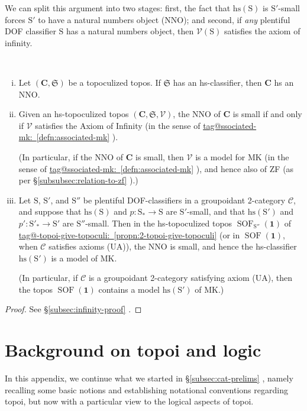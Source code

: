\documentclass{amsart}
\makeatletter
\newcommand\bC{\mathbf{C}}
\newcommand\cC{\mathcal{C}}
\newcommand\cV{\mathcal{V}}
\newcommand\enumbelow{\ }
\newcommand\fS{\mathfrak{S}}
\newcommand\hs{\mathrm{hs}}
\newcommand\rS{\mathrm{S}}
\newcommand\SOF{\operatorname{SOF}}
\newcommand\tm{\mathbf{1}}
\newcommand\tagword[1]{\csname tag@#1\endcsname}
\def\label@tag#1:#2\@nil{#1}
\newcommand\labeltag[1]{\label@tag#1:\@nil}
\newcommand\jref[1]{%
  \texorpdfstring%
    {\hyperref[#1]{\tagword{\labeltag{#1}}~\ref*{#1}}}%
    {\tagword{\labeltag{#1}}~\ref*{#1}}%
}
\newcommand\prerefpost[3]{%
  \texorpdfstring%
    {\hyperref[#2]{#1\ref*{#2}#3}}%
    {#1\ref*{#2}#3}%
}
\newcommand\sref[1]{\prerefpost{\S}{#1}{}}
\theoremstyle{definition}
\theoremstyle{remark}
\theoremstyle{plainwithref}
\makeatother
\begin{document}
We can split this argument into two stages: first, the fact that \( \hs(\rS) \) is \( \rS' \)-small forces \( \rS' \) to have a natural numbers object (NNO); and second, if \emph{any} plentiful DOF classifier \( \rS \) has a natural numbers object, then \( \cV(\rS) \) satisfies the axiom of infinity.
\begin{thm} \label{thm:infinity}\enumbelow
  \begin{enumerate}[(i)]
  \item\label{item:infinity-nno-exists} Let \( (\bC, \fS) \) be a topoculized topos.
    If \( \fS \) has an hs-classifier, then \( \bC \) hs an NNO.
  \item\label{item:infinity-small-nno} Given an hs-topoculized topos \( (\bC, \fS, \cV) \), the NNO of \( \bC \) is small if and only if \( \cV \) satisfies the Axiom of Infinity (in the sense of \jref{defn:associated-mk}).

    \noindent
    (In particular, if the NNO of \( \bC \) is small, then \( \cV \) is a model for MK (in the sense of \jref{defn:associated-mk}), and hence also of ZF (as per \sref{subsubsec:relation-to-zf}).)
  \item\label{item:infinity-2cat-has-nno}
    Let \( \rS \), \( \rS' \), and \( \rS'' \) be plentiful DOF-classifiers in a groupoidant 2-category \( \cC \), and suppose that \( \hs(\rS) \) and \( p \colon \rS_* \to \rS \) are \( \rS' \)-small, and that \( \hs(\rS') \) and \( p' \colon \rS'_* \to \rS' \) are \( \rS'' \)-small.
    Then in the hs-topoculized topos \( \SOF_{\rS''}(\tm) \) of \jref{propn:2-topoi-give-topoculi} (or in \( \SOF(\tm) \), when \( \cC \) satisfies axioms (UA)), the NNO is small, and hence the hs-classifier \( \hs(\rS') \) is a model of MK.

    \noindent
    (In particular, if \( \cC \) is a groupoidant 2-category satisfying axiom (UA), then the topos \( \SOF(\tm) \) contains a model \( \hs(\rS') \) of MK.)
  \end{enumerate}
\end{thm}
\begin{proof}
  See \sref{subsec:infinity-proof}.
\end{proof}

\appendix

\section{Background on topoi and logic} \label{sec:topos-logic-background}
In this appendix, we continue what we started in \sref{subsec:cat-prelims}, namely recalling some basic notions and establishing notational conventions regarding topoi, but now with a particular view to the logical aspects of topoi.
\end{document}
